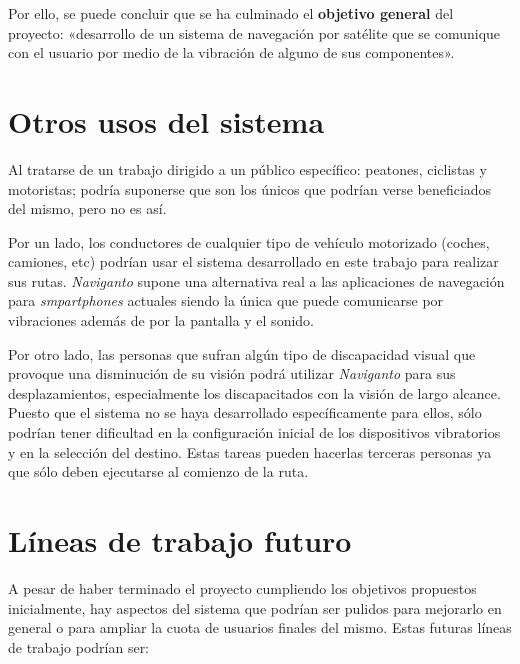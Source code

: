 Por ello, se puede concluir que se ha culminado el \textbf{objetivo general} del proyecto:
«desarrollo de un sistema de navegación por satélite que se comunique con el usuario por medio de la
  vibración de alguno de sus componentes».

\section{Otros usos del sistema}

Al tratarse de un trabajo dirigido a un público específico: peatones, ciclistas y motoristas; podría
suponerse que son los únicos que podrían verse beneficiados del mismo, pero no es así.

Por un lado, los conductores de cualquier tipo de vehículo motorizado (coches, camiones, etc)
podrían usar el sistema desarrollado en este trabajo para realizar sus rutas. \emph{Naviganto}
supone una alternativa real a las aplicaciones de navegación para \emph{smpartphones} actuales
siendo la única que puede comunicarse por vibraciones además de por la pantalla y el sonido.

Por otro lado, las personas que sufran algún tipo de discapacidad visual que provoque una
disminución de su visión podrá utilizar \emph{Naviganto} para sus desplazamientos, especialmente los
discapacitados con la visión de largo alcance. Puesto que el sistema no se haya desarrollado
específicamente para ellos, sólo podrían tener dificultad en la configuración inicial de los
dispositivos vibratorios y en la selección del destino. Estas tareas pueden hacerlas terceras
personas ya que sólo deben ejecutarse al comienzo de la ruta.

\section{Líneas de trabajo futuro}

A pesar de haber terminado el proyecto cumpliendo los objetivos propuestos inicialmente, hay
aspectos del sistema que podrían ser pulidos para mejorarlo en general o para ampliar la cuota de
usuarios finales del mismo. Estas futuras líneas de trabajo podrían ser:


